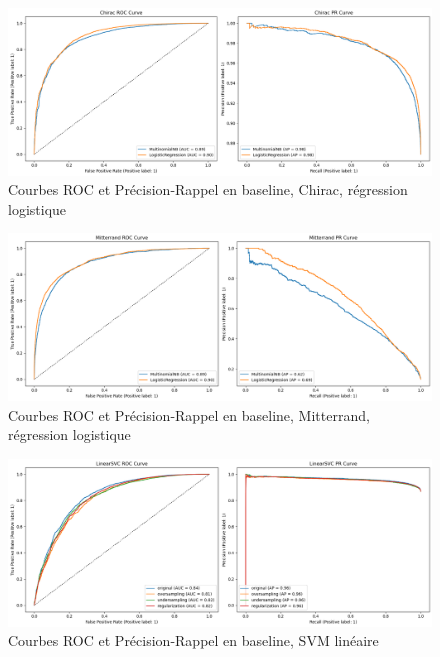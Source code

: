 \documentclass{article}
\begin{document}
\begin{figure}[H]
    \centering
    \includegraphics[width=\textwidth]{./src/locuteur/roc_curve_LogisticRegression_Chirac.png} 
    \caption{Courbes ROC et Précision-Rappel en baseline, Chirac, régression logistique}
    \label{roc_curve_LogisticRegression_Chirac}
\end{figure}

\begin{figure}[H]
    \centering
    \includegraphics[width=\textwidth]{./src/locuteur/roc_curve_LogisticRegression_Mitterrand.png} 
    \caption{Courbes ROC et Précision-Rappel en baseline, Mitterrand, régression logistique}
    \label{roc_curve_LogisticRegression_Mitterrand}
\end{figure}

\begin{figure}[H]
    \centering
    \includegraphics[width=\textwidth]{./src/locuteur/roc_curve_LinearSVC.png} 
    \caption{Courbes ROC et Précision-Rappel en baseline, SVM linéaire}
    \label{roc_curve_LinearSVC}
\end{figure}
\end{document}
